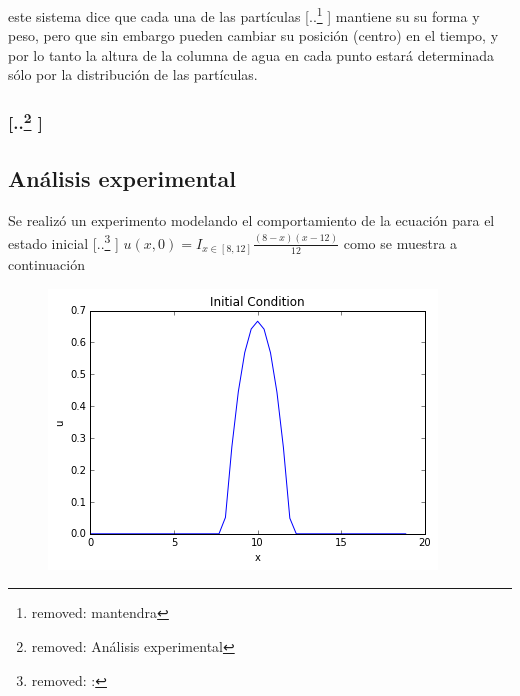 \documentclass[spanish]{article} %
\providecommand{\DIFaddtex}[1]{{\protect\color{blue} \sf #1}} %
\providecommand{\DIFdeltex}[1]{{\protect\color{red} [..\footnote{removed: #1} ]}} %
\providecommand{\DIFaddbegin}{} %
\providecommand{\DIFaddend}{} %
\providecommand{\DIFdelbegin}{} %
\providecommand{\DIFdelend}{} %
\providecommand{\DIFaddbeginFL}{} %
\providecommand{\DIFaddendFL}{} %
\providecommand{\DIFdelbeginFL}{} %
\providecommand{\DIFdelendFL}{} %
\providecommand{\DIFadd}[1]{\texorpdfstring{\DIFaddtex{#1}}{#1}} %
\providecommand{\DIFdel}[1]{\texorpdfstring{\DIFdeltex{#1}}{}} %
\begin{document}
    \noindent \DIFadd{este sistema }\DIFaddend dice que cada una de las partículas \DIFdelbegin \DIFdel{mantendra }\DIFdelend \DIFaddbegin \DIFadd{mantiene su }\DIFaddend su forma y peso, pero que sin embargo pueden cambiar su posición \DIFaddbegin \DIFadd{(centro) en }\DIFaddend el tiempo, y por lo tanto la altura de la columna de agua en cada punto estará determinada sólo por la distribución de las partículas.


    \DIFdelbegin \subsubsection{\DIFdel{Análisis experimental}}
\addtocounter{subsubsection}{-1}%
\DIFdelend \DIFaddbegin \subsection{\DIFadd{Análisis experimental}}
    \DIFaddend Se realizó un experimento modelando el comportamiento de la ecuación para el estado inicial \DIFdelbegin \DIFdel{:
    }%
\DIFdelend \DIFaddbegin \DIFadd{$u(x,0) = I_{x \in [8,12]}\frac{(8-x)(x-12)}{12}$ como se muestra a continuación
}

    \begin{figure}[H]
        \centering
        \DIFaddendFL \includegraphics[scale=0.6]{initialu.png}
    \DIFdelbeginFL %
\DIFdelendFL \DIFaddbeginFL \end{figure}
    \DIFaddend 
\end{document}
